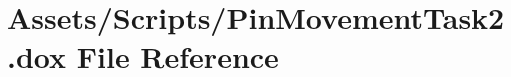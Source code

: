 \hypertarget{_pin_movement_task2_8dox}{}\section{Assets/\+Scripts/\+Pin\+Movement\+Task2.dox File Reference}
\label{_pin_movement_task2_8dox}
